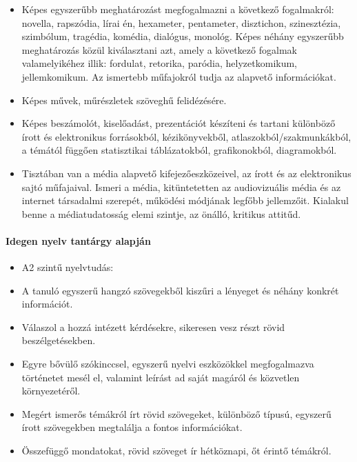 \begin{itemize}
\item Képes egyszerűbb meghatározást megfogalmazni a következő fogalmakról: novella, rapszódia, lírai én, hexameter, pentameter, disztichon, szinesztézia, szimbólum, tragédia, komédia, dialógus, monológ. Képes néhány egyszerűbb meghatározás közül kiválasztani azt, amely a következő fogalmak valamelyikéhez illik: fordulat, retorika, paródia, helyzetkomikum, jellemkomikum. Az ismertebb műfajokról tudja az alapvető információkat.
\item Képes művek, műrészletek szöveghű felidézésére.
\item Képes beszámolót, kiselőadást, prezentációt készíteni és tartani különböző írott és elektronikus forrásokból, kézikönyvekből, atlaszokból/szakmunkákból, a témától függően statisztikai táblázatokból, grafikonokból, diagramokból.
\item Tisztában van a média alapvető kifejezőeszközeivel, az írott és az elektronikus sajtó műfajaival. Ismeri a média, kitüntetetten az audiovizuális média és az internet társadalmi szerepét, működési módjának legfőbb jellemzőit. Kialakul benne a médiatudatosság elemi szintje, az önálló, kritikus attitűd.
\end{itemize}
\paragraph{Idegen nyelv tantárgy alapján}
\begin{itemize}
\item A2 szintű nyelvtudás:
\item A tanuló egyszerű hangzó szövegekből kiszűri a lényeget és néhány konkrét információt.
\item Válaszol a hozzá intézett kérdésekre, sikeresen vesz részt rövid beszélgetésekben.
\item Egyre bővülő szókinccsel, egyszerű nyelvi eszközökkel megfogalmazva történetet mesél el, valamint leírást ad saját magáról és közvetlen környezetéről.
\item Megért ismerős témákról írt rövid szövegeket, különböző típusú, egyszerű írott szövegekben megtalálja a fontos információkat.
\item Összefüggő mondatokat, rövid szöveget ír hétköznapi, őt érintő témákról.
\end{itemize}
